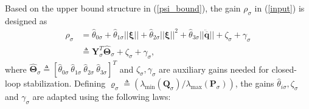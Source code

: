 \documentclass[AMA,STIX1COL,sort, compress]{WileyNJD-v2}
\begin{document}
Based on the upper bound structure in (\ref{psi_bound}), the gain $\rho_{\sigma}$ in (\ref{input}) is designed as
\begin{align}
\rho_{\sigma} &= \hat{\theta}_{0 \sigma}+ \hat{\theta}_{1 \sigma} ||  \boldsymbol{ \xi} ||+ \hat{\theta}_{2\sigma}||  \boldsymbol{ \xi} ||^2 +\hat{\theta}_{3 \sigma} || \ddot{\overline{\mathbf{q}}}|| +\zeta_\sigma+ \gamma_\sigma \nonumber\\
&\triangleq \mathbf{Y}^T_{\sigma}\hat{\boldsymbol \Theta}_{\sigma}+ \zeta_\sigma+ \gamma_\sigma, \label{rho}
\end{align}
where $\hat{\boldsymbol \Theta}_{\sigma} \triangleq [\hat{\theta}_{0\sigma} ~ \hat{\theta}_{1\sigma} ~\hat{\theta}_{2\sigma}~ \hat{\theta}_{3 \sigma}]^T$ and $\zeta_\sigma, \gamma_\sigma$ are auxiliary gains needed for closed-loop stabilization. 
Defining $\varrho_\sigma \triangleq ({\lambda_{\min}( \mathbf{Q}_{\sigma} )}/{\lambda_{\max}( \mathbf{P}_{\sigma} )})$, the gains $\hat{\theta}_{i\sigma}, \zeta_\sigma$ and $ \gamma_{\sigma}$ are adapted using the following laws:
\end{document}
